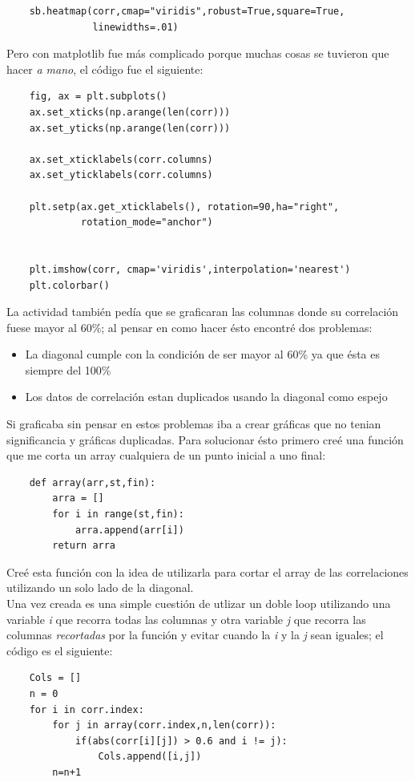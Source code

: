 \documentclass[12pt]{article}
\begin{document}
\begin{verbatim}
    sb.heatmap(corr,cmap="viridis",robust=True,square=True,
               linewidths=.01)
\end{verbatim}
Pero con matplotlib fue m\'as complicado porque muchas cosas se tuvieron que hacer \textit{a mano}, el c\'odigo fue el siguiente:
\begin{verbatim}
    fig, ax = plt.subplots()
    ax.set_xticks(np.arange(len(corr)))
    ax.set_yticks(np.arange(len(corr)))
    
    ax.set_xticklabels(corr.columns)
    ax.set_yticklabels(corr.columns)
    
    plt.setp(ax.get_xticklabels(), rotation=90,ha="right",
             rotation_mode="anchor")
    
    
    plt.imshow(corr, cmap='viridis',interpolation='nearest')
    plt.colorbar()

\end{verbatim}
La actividad tambi\'en ped\'ia que se graficaran las columnas donde su correlaci\'on fuese mayor al 60\%; al pensar en como hacer \'esto encontr\'e dos problemas:
\begin{itemize}
    \item La diagonal cumple con la condici\'on de ser mayor al 60\% ya que \'esta es siempre del 100\%
    \item Los datos de correlaci\'on estan duplicados usando la diagonal como espejo
\end{itemize}
Si graficaba sin pensar en estos problemas iba a crear gr\'aficas que no tenian significancia y gr\'aficas duplicadas.
Para solucionar \'esto primero cre\'e una funci\'on que me corta un array cualquiera de un punto inicial a uno final:
\begin{verbatim}
    def array(arr,st,fin):
        arra = []
        for i in range(st,fin):
            arra.append(arr[i])
        return arra
\end{verbatim}
Cre\'e esta funci\'on con la idea de utilizarla para cortar el array de las correlaciones utilizando un solo lado de la diagonal.\\
Una vez creada es una simple cuesti\'on de utlizar un doble loop utilizando una variable \textit{i} que recorra todas las columnas y otra variable \textit{j} que recorra las columnas \textit{recortadas} por la funci\'on y evitar cuando la \textit{i} y la \textit{j} sean iguales; el c\'odigo es el siguiente:
\begin{verbatim}
    Cols = []
    n = 0
    for i in corr.index:
        for j in array(corr.index,n,len(corr)):
            if(abs(corr[i][j]) > 0.6 and i != j):
                Cols.append([i,j])
        n=n+1
\end{verbatim}
\end{document}
